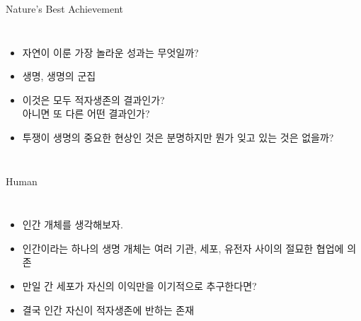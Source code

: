 \documentclass[final]{beamer}
\begin{document}
\begin{frame}[t]{Nature's Best Achievement}
	\begin{columns}[c]
	\column{18em}
	\begin{itemize}
		\item 자연이 이룬 가장 놀라운 성과는 무엇일까? 
		\item 생명, 생명의 군집
		\item 이것은 모두 적자생존의 결과인가? \\
		아니면 또 다른 어떤 결과인가?
		\item 투쟁이 생명의 중요한 현상인 것은 분명하지만 뭔가 잊고 있는 것은 없을까?
	\end{itemize}
	\column{12em}
	\hspace{-1em}
	\end{columns}
\end{frame}

\begin{frame}[t]{Human}
	\begin{columns}[c]
		\column{15em}
		\begin{itemize}
			\item 인간 개체를 생각해보자.
			\item 인간이라는 하나의 생명 개체는 여러 기관, 세포, 유전자 사이의 절묘한 협업에 의존 
			\item 만일 간 세포가 자신의 이익만을 이기적으로 추구한다면? 
			\item 결국 인간 자신이 적자생존에 반하는 존재
		\end{itemize}
		\column{16em}
	\end{columns}
\end{frame}
\end{document}
